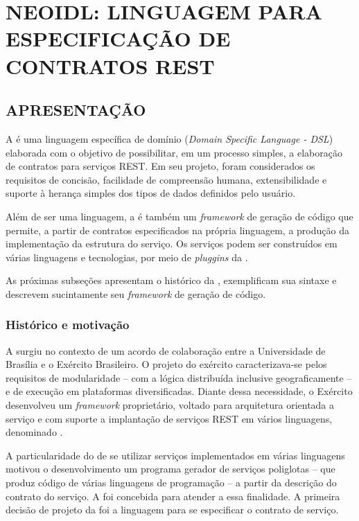 \chapter{NEOIDL: LINGUAGEM PARA ESPECIFICAÇÃO DE CONTRATOS REST	}
\vspace{-6mm}


\section{APRESENTAÇÃO}
\label{apresentacaoNeoIDL}

A \neoidl{} é uma linguagem específica de domínio (\textit{Domain Specific
Language - DSL}) elaborada com o objetivo de possibilitar, em um processo
simples, a elaboração de contratos para serviços REST. Em seu projeto, 
foram considerados os requisitos de concisão, facilidade de compreensão humana,
extensibilidade e suporte à herança simples dos tipos de dados definidos pelo
usuário.

Além de ser uma linguagem, a \neoidl{} é também um \textit{framework} de geração
de código que permite, a partir de contratos especificados na própria
linguagem, a produção da implementação da estrutura do serviço. Os serviços
podem ser construídos em várias linguagens e tecnologias, por meio
de \textit{pluggins} da \neoidl{}.

As próximas subseções apresentam o histórico da \neoidl{}, exemplificam sua
sintaxe e descrevem sucintamente seu \textit{framework} de geração de código.


\subsection{Histórico e motivação}
\label{histMotivNeoIDL}
\vspace{-6mm}

A \neoidl{} surgiu no contexto de um acordo de colaboração entre a Universidade
de Brasília e o Exército Brasileiro. O projeto do exército caracterizava-se
pelos requisitos de modularidade -- com a lógica distribuída inclusive
geograficamente -- e de execução em plataformas diversificadas. Diante dessa
necessidade, o Exército desenvolveu um \textit{framework} proprietário,
voltado para arquitetura orientada a serviço e com suporte
a implantação de serviços REST em vários linguagens, denominado \neocortex{}.

A particularidade do \neocortex{} de se utilizar serviços implementados em
várias linguagens motivou o desenvolvimento um programa gerador de serviços
poliglotas -- que produz código de várias linguagens de programação -- a partir da
descrição do contrato do serviço. A \neoidl{} foi concebida para atender a essa
finalidade. A primeira decisão de projeto da \neoidl{} foi a linguagem para se
especificar o contrato de serviço.

